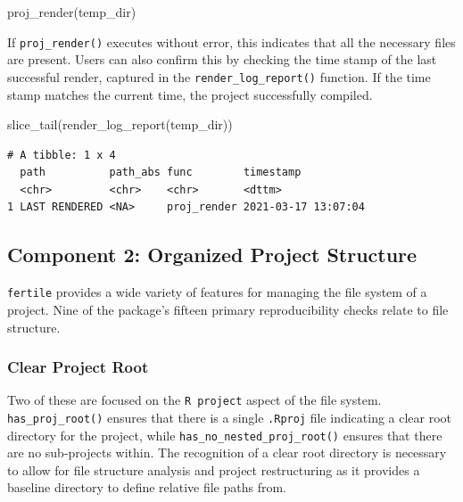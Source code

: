 \documentclass[12pt,twoside]{reedthesis}
\newenvironment{Shaded}{\begin{snugshade}}{\end{snugshade}}
\newcommand{\FunctionTok}[1]{\textcolor[rgb]{0.00,0.00,0.00}{#1}}
\newcommand{\NormalTok}[1]{#1}
\begin{document}
\begin{Shaded}
\begin{Highlighting}[]
\FunctionTok{proj\_render}\NormalTok{(temp\_dir)}
\end{Highlighting}
\end{Shaded}
If \texttt{proj\_render()} executes without error, this indicates that all the necessary files are present. Users can also confirm this by checking the time stamp of the last successful render, captured in the \texttt{render\_log\_report()} function. If the time stamp matches the current time, the project successfully compiled.
\begin{Shaded}
\begin{Highlighting}[]
\FunctionTok{slice\_tail}\NormalTok{(}\FunctionTok{render\_log\_report}\NormalTok{(temp\_dir))}
\end{Highlighting}
\end{Shaded}
\begin{verbatim}
# A tibble: 1 x 4
  path          path_abs func        timestamp          
  <chr>         <chr>    <chr>       <dttm>             
1 LAST RENDERED <NA>     proj_render 2021-03-17 13:07:04
\end{verbatim}
\hypertarget{component-2-organized-project-structure}{%
\subsection{Component 2: Organized Project Structure}\label{component-2-organized-project-structure}}

\texttt{fertile} provides a wide variety of features for managing the file system of a project. Nine of the package's fifteen primary reproducibility checks relate to file structure.

\hypertarget{clear-project-root}{%
\subsubsection{Clear Project Root}\label{clear-project-root}}

Two of these are focused on the \texttt{R\ project} aspect of the file system. \texttt{has\_proj\_root()} ensures that there is a single \texttt{.Rproj} file indicating a clear root directory for the project, while \texttt{has\_no\_nested\_proj\_root()} ensures that there are no sub-projects within. The recognition of a clear root directory is necessary to allow for file structure analysis and project restructuring as it provides a baseline directory to define relative file paths from.
\end{document}
